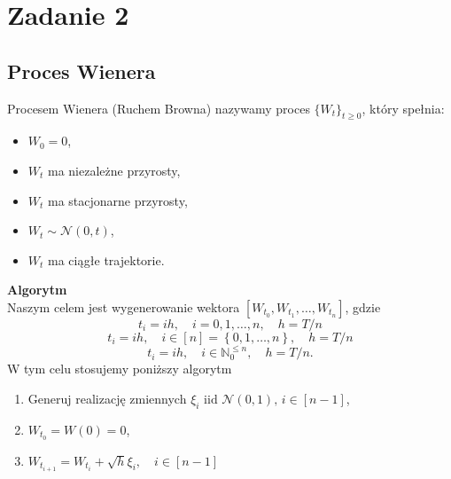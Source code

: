 \documentclass[12pt]{mwart}
\begin{document}
	
	\section{Zadanie 2}
	\subsection{Proces Wienera}
	\noindent Procesem Wienera (Ruchem Browna) nazywamy proces $\{W_t\}_{t\geqslant0}$, który spełnia:
	\begin{itemize}[leftmargin=10mm]%
		\item $W_0=0$,
		\item $W_t$ ma niezależne przyrosty,
		\item $W_t$ ma stacjonarne przyrosty,
		\item $W_t \sim \mathcal{N}(0, t)$,
		\item $W_t$ ma ciągłe trajektorie.
	\end{itemize}	
	\noindent \textbf{Algorytm}\\
	\noindent Naszym celem jest wygenerowanie wektora $\left[W_{t_0}, W_{t_1}, \dots, W_{t_n}\right]$, gdzie
	\begin{equation}
		t_i=ih, \quad i=0,1,\dots,n, \quad h=T/n
	\end{equation}
	\begin{equation}
		t_i=ih, \quad i\in\left[n\right]=\left\{0, 1, \dots, n\right\}, \quad h=T/n
	\end{equation}
	\begin{equation}
		t_i=ih, \quad i\in\mathbb{N}_0^{\leqslant n}, \quad h=T/n.
	\end{equation}
	W tym celu stosujemy poniższy algorytm
	\begin{enumerate}[leftmargin=10mm]
		\item Generuj realizację zmiennych $\xi_i\text{ iid }\mathcal{N}(0,1), \,i\in\left[n-1\right]$,
		\item $W_{t_0}=W\left(0\right)=0$,
		\item $W_{t_{i+1}} = W_{t_{i}}+\sqrt{h}\xi_i,\quad i\in\left[n-1\right]$%
	\end{enumerate}
\end{document}

